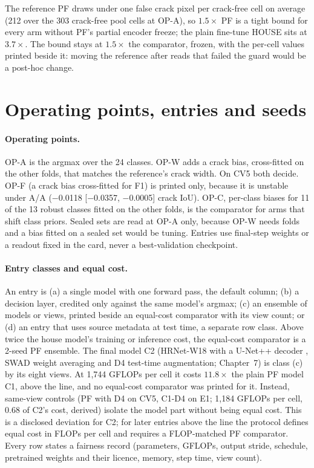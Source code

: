 The reference PF draws under one false crack pixel per crack-free cell on average (212 over the 303
crack-free pool cells at OP-A), so $1.5\times$ PF is a tight bound for every arm without PF's partial encoder freeze; the plain fine-tune
HOUSE sits at $3.7\times$. The bound stays at $1.5\times$ the comparator, frozen, with the per-cell values printed beside it: moving the reference
after reads that failed the guard would be a post-hoc change.

\section{Operating points, entries and seeds}
\label{sec:protocol-entries}

\paragraph{Operating points.} OP-A is the argmax over the 24 classes. OP-W adds a crack bias, cross-fitted on the other folds, that
matches the reference's crack width. On CV5 both decide. OP-F (a crack bias cross-fitted for F1) is printed only, because it is
unstable under A/A ($-$0.0118 [$-$0.0357, $-$0.0005] crack IoU). OP-C, per-class biases for 11 of the 13 robust classes fitted on the
other folds, is the comparator for arms that shift class priors. Sealed sets are read at OP-A only, because OP-W needs folds and a bias fitted on a sealed set would be tuning. Entries use final-step weights or a readout
fixed in the card, never a best-validation checkpoint.

\paragraph{Entry classes and equal cost.} An entry is (a) a single model with one forward pass, the default column; (b) a decision
layer, credited only against the same model's argmax; (c) an ensemble of models or views, printed beside an equal-cost comparator with
its view count; or (d) an entry that uses source metadata at test time, a separate row class. Above twice the house model's training
or inference cost, the equal-cost comparator is a 2-seed PF ensemble. The final model C2 (HRNet-W18 \citep{wang2021hrnet} with a
U-Net++ decoder \citep{zhou2018unetpp}, SWAD weight averaging \citep{cha2021swad} and D4 test-time augmentation; Chapter~7) is class
(c) by its eight views. At 1,744 GFLOPs per cell it costs $11.8\times$ the plain PF model C1, above the line, and no equal-cost
comparator was printed for it. Instead, same-view controls (PF with D4 on CV5, C1-D4 on E1; 1,184 GFLOPs per cell, 0.68 of C2's cost,
derived) isolate the model part without being equal cost. This is a disclosed deviation for C2; for later entries above the line the
protocol defines equal cost in FLOPs per cell and requires a FLOP-matched PF comparator. Every row states a fairness record
(parameters, GFLOPs, output stride, schedule, pretrained weights and their licence, memory, step time, view count).

